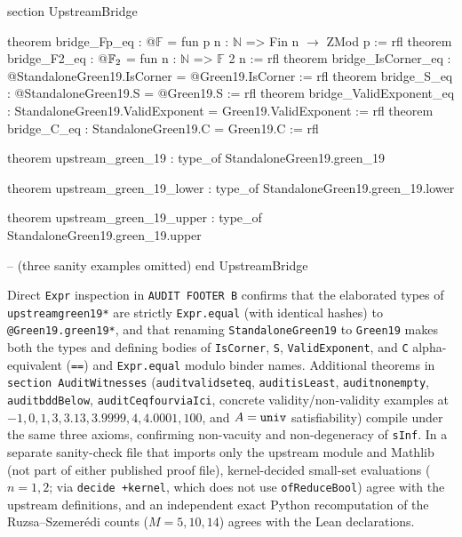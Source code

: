 \documentclass[11pt,reqno]{amsart}
\theoremstyle{remark}
\newcommand{\F}{\mathbb{F}}
\newcommand{\N}{\mathbb{N}}
\newcommand{\LeanUS}{\textunderscore\hspace{0pt}}
\newcommand{\lean}[1]{{\let\_\LeanUS\texttt{#1}}}
\begin{document}
\begin{leancode}
section UpstreamBridge

theorem bridge_Fp_eq : @\(\F\) = fun p n : \(\N\) => Fin n \(\to\) ZMod p := rfl
theorem bridge_F2_eq : @\(\F\sb{2}\) = fun n : \(\N\) => \(\F\) 2 n := rfl
theorem bridge_IsCorner_eq : @StandaloneGreen19.IsCorner = @Green19.IsCorner := rfl
theorem bridge_S_eq : @StandaloneGreen19.S = @Green19.S := rfl
theorem bridge_ValidExponent_eq :
    StandaloneGreen19.ValidExponent = Green19.ValidExponent := rfl
theorem bridge_C_eq : StandaloneGreen19.C = Green19.C := rfl

theorem upstream_green_19 :
    type_of%
  StandaloneGreen19.green_19

theorem upstream_green_19_lower :
    type_of%
  StandaloneGreen19.green_19.lower

theorem upstream_green_19_upper :
    type_of%
  StandaloneGreen19.green_19.upper

-- (three sanity examples omitted)
end UpstreamBridge
\end{leancode}

Direct \lean{Expr} inspection in \lean{AUDIT FOOTER B} confirms that the elaborated types of \lean{upstream\_green\_19*} are strictly \lean{Expr.\allowbreak{}equal} (with identical hashes) to \lean{@Green19.\allowbreak{}green\_19*}, and that renaming \lean{StandaloneGreen19} to \lean{Green19} makes both the types and defining bodies of \lean{IsCorner}, \lean{S}, \lean{ValidExponent}, and \lean{C} alpha-equivalent (\lean{==}) and \lean{Expr.\allowbreak{}equal} modulo binder names. Additional theorems in \lean{section AuditWitnesses} (\lean{audit\_valid\_set\_eq}, \lean{audit\_isLeast}, \lean{audit\_nonempty}, \lean{audit\_bddBelow}, \lean{audit\_C\_eq\_four\_via\_Ici}, concrete validity/non-validity examples at $-1, 0, 1, 3, 3.13, 3.9999, 4, 4.0001, 100$, and $A = \lean{univ}$ satisfiability) compile under the same three axioms, confirming non-vacuity and non-degeneracy of \lean{sInf}. In a separate sanity-check file that imports only the upstream module and Mathlib (not part of either published proof file), kernel-decided small-set evaluations ($n = 1, 2$; via \lean{decide +kernel}, which does not use \lean{ofReduceBool}) agree with the upstream definitions, and an independent exact Python recomputation of the Ruzsa--Szemer\'edi counts ($M = 5, 10, 14$) agrees with the Lean declarations.
\end{document}
